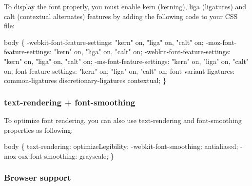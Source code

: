 To display the font properly, you must enable {\ttfamily kern} (kerning), {\ttfamily liga} (ligatures) and {\ttfamily calt} (contextual alternates) features by adding the following code to your C\+SS file\+:


\begin{DoxyCode}
body \{
    -webkit-font-feature-settings: "kern" on, "liga" on, "calt" on;
    -moz-font-feature-settings: "kern" on, "liga" on, "calt" on;
    -webkit-font-feature-settings: "kern" on, "liga" on, "calt" on;
    -ms-font-feature-settings: "kern" on, "liga" on, "calt" on;
    font-feature-settings: "kern" on, "liga" on, "calt" on;
    font-variant-ligatures: common-ligatures discretionary-ligatures contextual;
\}
\end{DoxyCode}


\subsubsection*{{\ttfamily text-\/rendering} + {\ttfamily font-\/smoothing}}

To optimize font rendering, you can also use {\ttfamily text-\/rendering} and {\ttfamily font-\/smoothing} properties as following\+:


\begin{DoxyCode}
body \{
    text-rendering: optimizeLegibility;
    -webkit-font-smoothing: antialiased;
    -moz-osx-font-smoothing: grayscale;
\}
\end{DoxyCode}


\subsubsection*{Browser support}

